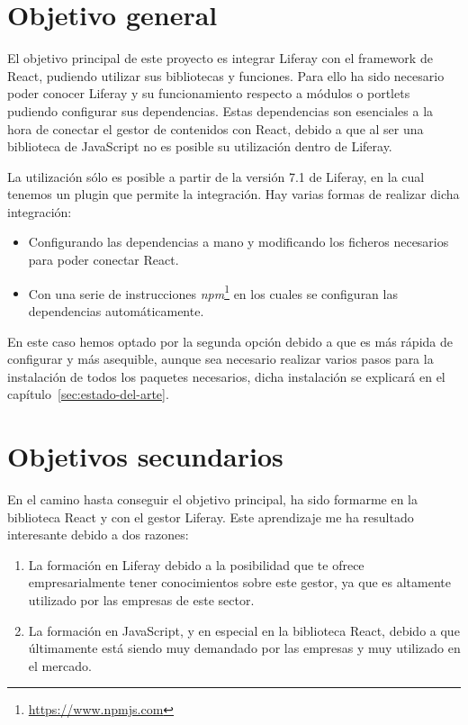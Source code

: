\documentclass[a4paper, 12pt]{book}
\begin{document}
\section{Objetivo general} %
\label{sec:objetivo-general} %

El objetivo principal de este proyecto es integrar Liferay con el framework de React, pudiendo utilizar sus bibliotecas y funciones. Para ello ha sido necesario poder conocer Liferay y su funcionamiento respecto a módulos o portlets pudiendo configurar sus dependencias. Estas dependencias son esenciales a la hora de conectar el gestor de contenidos con React, debido a que al ser una biblioteca de JavaScript no es posible su utilización dentro de Liferay.

La utilización sólo es posible a partir de la versión 7.1 de Liferay, en la cual tenemos un plugin que permite la integración. Hay varias formas de realizar dicha integración:
\begin{itemize}
    \item Configurando las dependencias a mano y modificando los ficheros necesarios para poder conectar React.
    \item Con una serie de instrucciones \textit{npm}\footnote{\url{https://www.npmjs.com}} en los cuales se configuran las dependencias automáticamente.
\end{itemize}

En este caso hemos optado por la segunda opción debido a que es más rápida de configurar y más asequible, aunque sea necesario realizar varios pasos para la instalación de todos los paquetes necesarios, dicha instalación se explicará en el capítulo~\ref{sec:estado-del-arte}.

\section{Objetivos secundarios}
\label{sec:objetivos-secundarios}
En el camino hasta conseguir el objetivo principal, ha sido formarme en la biblioteca React y con el gestor Liferay. Este aprendizaje me ha resultado interesante debido a dos razones:

\begin{enumerate}
    \item La formación en Liferay debido a la posibilidad que te ofrece empresarialmente tener conocimientos sobre este gestor, ya que es altamente utilizado por las empresas de este sector.
    \item La formación en JavaScript, y en especial en la biblioteca React, debido a que últimamente está siendo muy demandado por las empresas y muy utilizado en el mercado.
    
\end{enumerate}
\end{document}
